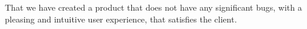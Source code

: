 That we have created a product that does not have any significant bugs, with a pleasing and intuitive user experience, that satisfies the client.
